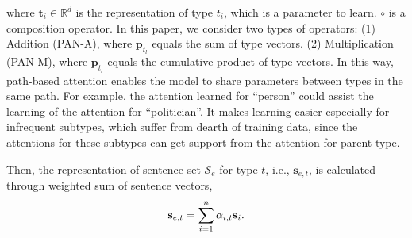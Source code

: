 \documentclass[letterpaper]{article} %
\begin{document}
where $\mathbf{t}_i \in \mathbb{R}^{d}$ is the representation of type $t_i$, which is a parameter to learn. $\circ$ is a  composition operator. 
In this paper, we consider two  types of operators: (1) Addition (PAN-A), where $\mathbf{p}_{t_l}$ equals the sum of type vectors. %
(2) Multiplication (PAN-M), where $\mathbf{p}_{t_l}$ equals the cumulative product of type vectors. %
In this way, path-based attention enables the model to share parameters between types in the same path. For example, the attention learned for ``person'' could assist the learning of the attention for ``politician''. It makes learning easier especially for infrequent subtypes, which suffer from dearth of training data, since the attentions for these subtypes can get support from the attention for parent type. 

Then, the representation of sentence set $\mathcal{S}_e$ for type $t$, i.e., $\mathbf{s}_{e,t}$, is calculated through weighted sum of sentence vectors,
\vspace{-6pt}
\[
\mathbf{s}_{e,t}=\sum_{i=1}^{n} \alpha_{i,t}\mathbf{s}_i. %
\vspace{-6pt}
\]
\end{document}
